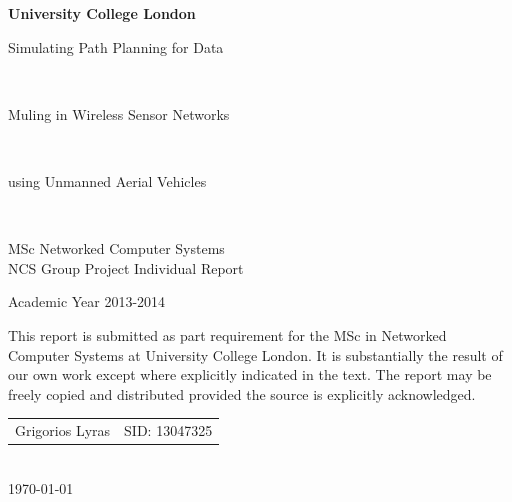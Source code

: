 \begin{titlepage}

\begin{center}
\begin{LARGE}\textbf{
University College London\\}\end{LARGE}
\vspace{1cm}
\begin{Large}Simulating Path Planning for Data\end{Large}\\
\begin{Large}Muling in Wireless Sensor Networks\end{Large}\\
\begin{Large}using Unmanned Aerial Vehicles\end{Large}\\
\vspace{2cm}
\begin{LARGE}
MSc Networked Computer Systems\\
NCS Group Project Individual Report\\
\end{LARGE}
\large{Academic Year 2013-2014}\\
\vfill
\end{center}
This report is submitted as part requirement for the MSc in Networked Computer
Systems at University College London. It is substantially the result of our own
work except where explicitly indicated in the text. The report may be freely
copied and distributed provided the source is explicitly acknowledged.\\
\begin{center}
\begin{tabular}{l r}
\Large{Grigorios Lyras}&
\large{SID: 13047325}\\
\end{tabular}\\
\vspace{1cm}
\large\today\\
\end{center}
\end{titlepage}

